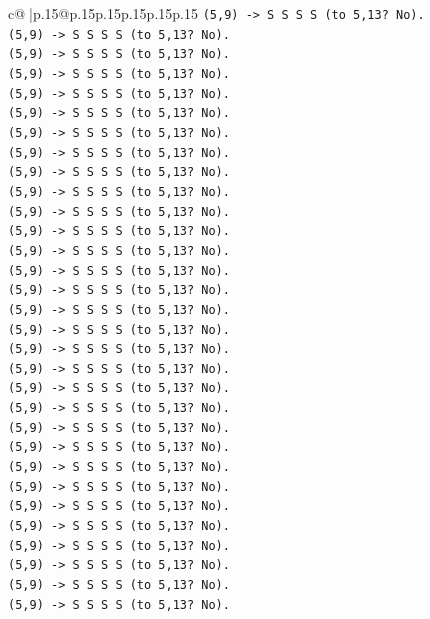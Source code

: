 \documentclass{article}
\begin{document}
{\begin{supertabular}{c@{$\;$}|p{.15\linewidth}@{}p{.15\linewidth}p{.15\linewidth}p{.15\linewidth}p{.15\linewidth}p{.15\linewidth}}
{{{\texttt{(5,9) {-}> S S S S (to 5,13? No).} \\
\texttt{(5,9) {-}> S S S S (to 5,13? No).} \\
\texttt{(5,9) {-}> S S S S (to 5,13? No).} \\
\texttt{(5,9) {-}> S S S S (to 5,13? No).} \\
\texttt{(5,9) {-}> S S S S (to 5,13? No).} \\
\texttt{(5,9) {-}> S S S S (to 5,13? No).} \\
\texttt{(5,9) {-}> S S S S (to 5,13? No).} \\
\texttt{(5,9) {-}> S S S S (to 5,13? No).} \\
\texttt{(5,9) {-}> S S S S (to 5,13? No).} \\
\texttt{(5,9) {-}> S S S S (to 5,13? No).} \\
\texttt{(5,9) {-}> S S S S (to 5,13? No).} \\
\texttt{(5,9) {-}> S S S S (to 5,13? No).} \\
\texttt{(5,9) {-}> S S S S (to 5,13? No).} \\
\texttt{(5,9) {-}> S S S S (to 5,13? No).} \\
\texttt{(5,9) {-}> S S S S (to 5,13? No).} \\
\texttt{(5,9) {-}> S S S S (to 5,13? No).} \\
\texttt{(5,9) {-}> S S S S (to 5,13? No).} \\
\texttt{(5,9) {-}> S S S S (to 5,13? No).} \\
\texttt{(5,9) {-}> S S S S (to 5,13? No).} \\
\texttt{(5,9) {-}> S S S S (to 5,13? No).} \\
\texttt{(5,9) {-}> S S S S (to 5,13? No).} \\
\texttt{(5,9) {-}> S S S S (to 5,13? No).} \\
\texttt{(5,9) {-}> S S S S (to 5,13? No).} \\
\texttt{(5,9) {-}> S S S S (to 5,13? No).} \\
\texttt{(5,9) {-}> S S S S (to 5,13? No).} \\
\texttt{(5,9) {-}> S S S S (to 5,13? No).} \\
\texttt{(5,9) {-}> S S S S (to 5,13? No).} \\
\texttt{(5,9) {-}> S S S S (to 5,13? No).} \\
\texttt{(5,9) {-}> S S S S (to 5,13? No).} \\
\texttt{(5,9) {-}> S S S S (to 5,13? No).} \\
\texttt{(5,9) {-}> S S S S (to 5,13? No).} \\
}}}
\end{supertabular}}
\end{document}
